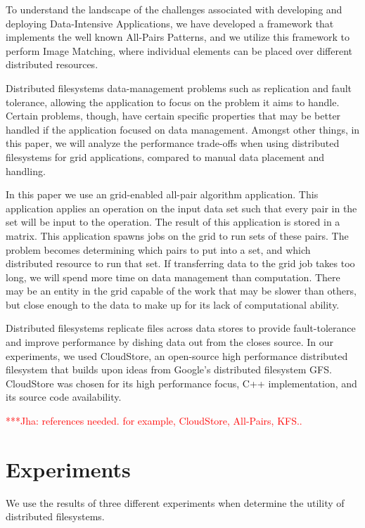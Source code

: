 \documentclass[a4paper,11pt]{article} \usepackage[utf8]{inputenc}
\newcommand{\jhanote}[1]{ {\textcolor{red} { ***Jha: #1 }}}
\newcommand{\yyenote}[1]{ {\textcolor{blue} { ***yye00: #1 }}} \else
\newcommand{\jhanote}[1]{} \newcommand{\yyenote}[1]{}
\begin{document}
To understand the landscape of the challenges associated with developing
and deploying Data-Intensive Applications, we have developed a framework
that implements the well known All-Pairs Patterns, and we utilize this
framework to perform Image Matching, where individual elements can be
placed over different distributed resources.

Distributed filesystems %
data-management problems such as replication and fault tolerance,
allowing the application to focus on the problem it aims to handle.
Certain problems, though, have certain specific properties that may be
better handled if the application focused on data management.  Amongst
other things, in this paper, we will analyze the performance trade-offs
when using distributed filesystems for grid applications, compared to
manual data placement and handling.

In this paper we use an grid-enabled all-pair algorithm application.
This application applies an operation on the input data set such that
every pair in the set will be input to the operation.  The result of
this application is stored in a matrix.  This application spawns jobs on
the grid to run sets of these pairs.  The problem becomes determining
which pairs to put into a set, and which distributed resource to run
that set.  If transferring data to the grid job takes too long, we will
spend more time on data management than computation.  There may be an
entity in the grid capable of the work that may be slower than others,
but close enough to the data to make up for its lack of computational
ability.

Distributed filesystems replicate files across data stores to provide
fault-tolerance and improve performance by dishing data out from the
closes source.  In our experiments, we used CloudStore, an open-source
high performance distributed filesystem that builds upon ideas from
Google's distributed filesystem GFS.  CloudStore was chosen for its high
performance focus, C++ implementation, and its source code availability.

\jhanote{references needed. for example, CloudStore, All-Pairs, KFS.. }

\section{Experiments}

We use the results of three different experiments when determine the
utility of distributed filesystems.
\end{document}
